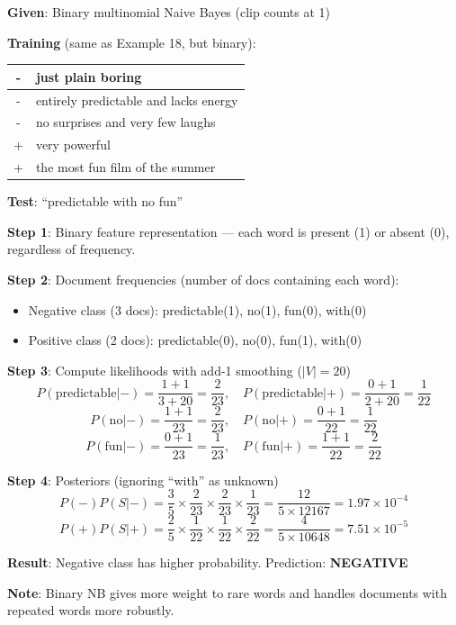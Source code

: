 \documentclass[11pt,a4paper]{article}
\begin{document}
\begin{tcolorbox}[colback=green!5!white,colframe=green!75!black,title=\textbf{Worked Example 20: Naive Bayes with Binary Features}]
\textbf{Given}: Binary multinomial Naive Bayes (clip counts at 1)

\textbf{Training} (same as Example 18, but binary):
\begin{center}
\begin{tabular}{|c|l|}
\hline
- & just plain boring \\ \hline
- & entirely predictable and lacks energy \\ \hline
- & no surprises and very few laughs \\ \hline
+ & very powerful \\ \hline
+ & the most fun film of the summer \\ \hline
\end{tabular}
\end{center}

\textbf{Test}: ``predictable with no fun''

\textbf{Step 1}: Binary feature representation --- each word is present (1) or absent (0), regardless of frequency.

\textbf{Step 2}: Document frequencies (number of docs containing each word):
\begin{itemize}
    \item Negative class (3 docs): predictable(1), no(1), fun(0), with(0)
    \item Positive class (2 docs): predictable(0), no(0), fun(1), with(0)
\end{itemize}

\textbf{Step 3}: Compute likelihoods with add-1 smoothing ($|V| = 20$)
\[
P(\text{predictable}|-) = \frac{1+1}{3+20} = \frac{2}{23}, \quad
P(\text{predictable}|+) = \frac{0+1}{2+20} = \frac{1}{22}
\]
\[
P(\text{no}|-) = \frac{1+1}{23} = \frac{2}{23}, \quad
P(\text{no}|+) = \frac{0+1}{22} = \frac{1}{22}
\]
\[
P(\text{fun}|-) = \frac{0+1}{23} = \frac{1}{23}, \quad
P(\text{fun}|+) = \frac{1+1}{22} = \frac{2}{22}
\]

\textbf{Step 4}: Posteriors (ignoring ``with'' as unknown)
\[
P(-)P(S|-) = \frac{3}{5} \times \frac{2}{23} \times \frac{2}{23} \times \frac{1}{23} = \frac{12}{5 \times 12167} = 1.97 \times 10^{-4}
\]
\[
P(+)P(S|+) = \frac{2}{5} \times \frac{1}{22} \times \frac{1}{22} \times \frac{2}{22} = \frac{4}{5 \times 10648} = 7.51 \times 10^{-5}
\]

\textbf{Result}: Negative class has higher probability. Prediction: \textbf{NEGATIVE}

\textbf{Note}: Binary NB gives more weight to rare words and handles documents with repeated words more robustly.
\end{tcolorbox}
\end{document}

